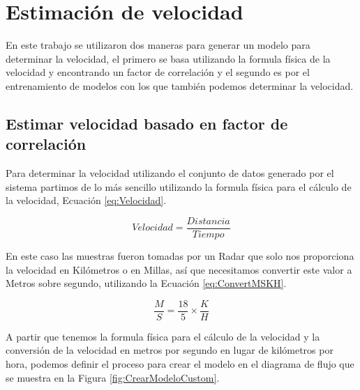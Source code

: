 \section{Estimación de velocidad}
\label{cap:EstimacionVelocidad}

En este trabajo se utilizaron dos maneras para generar un modelo para determinar la velocidad, el primero se basa utilizando la formula física de la velocidad y encontrando un factor de correlación y el segundo es por el entrenamiento de modelos con los que también podemos determinar la velocidad.

\subsection{Estimar velocidad basado en factor de correlación}

Para determinar la velocidad utilizando el conjunto de datos generado por el sistema partimos de lo más sencillo utilizando la formula física para el cálculo de la velocidad, Ecuación \ref{eq:Velocidad}.

\begin{equation}
    \label{eq:Velocidad}
    Velocidad = \frac{Distancia}{Tiempo}
\end{equation}

En este caso las muestras fueron tomadas por un Radar que solo nos proporciona la velocidad en Kilómetros o en Millas, así que necesitamos convertir este valor a Metros sobre segundo, utilizando la Ecuación \ref{eq:ConvertMSKH}.

\begin{equation}
    \label{eq:ConvertMSKH}
    \frac{M}{S} = \frac{18}{5} \times \frac{K}{H}
\end{equation}

A partir que tenemos la formula física para el cálculo de la velocidad y la conversión de la velocidad en metros por segundo en lugar de kilómetros por hora, podemos definir el proceso para crear el modelo en el diagrama de flujo que se muestra en la Figura \ref{fig:CrearModeloCustom}.

